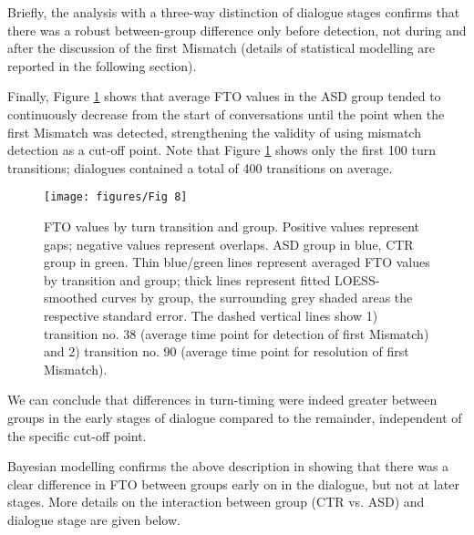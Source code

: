 Briefly, the analysis with a three-way distinction of dialogue stages confirms that there was a robust between-group difference only before detection, not during and after the discussion of the first Mismatch (details of statistical modelling are reported in the following section).

Finally, Figure \ref{fig:FTOStageContinuous} shows that average FTO values in the ASD group tended to continuously decrease from the start of conversations until the point when the first Mismatch was detected, strengthening the validity of using mismatch detection as a cut-off point. Note that Figure \ref{fig:FTOStageContinuous} shows only the first 100 turn transitions; dialogues contained a total of 400 transitions on average.

\begin{figure}

{\centering \texttt{[image: figures/Fig 8]} 
	
}

\caption{FTO values by turn transition and group. Positive values represent gaps; negative values represent overlaps. ASD group in blue, CTR group in green. Thin blue/green lines represent averaged FTO values by transition and group; thick lines represent fitted LOESS-smoothed curves by group, the surrounding grey shaded areas the respective standard error. The dashed vertical lines show 1) transition no. 38 (average time point for detection of first Mismatch) and 2) transition no. 90 (average time point for resolution of first Mismatch).}\label{fig:FTOStageContinuous}
\end{figure}

We can conclude that differences in turn-timing were indeed greater between groups in the early stages of dialogue compared to the remainder, independent of the specific cut-off point.

\label{turntaking_results_FTO_stage_bayesian}

Bayesian modelling confirms the above description in showing that there was a clear difference in FTO between groups early on in the dialogue, but not at later stages. More details on the interaction between group (CTR vs. ASD) and dialogue stage are given below.

